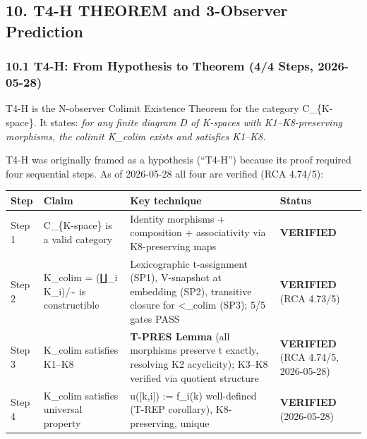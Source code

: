 \documentclass[
  11pt,
]{article}
\newcounter{none} %
\begin{document}
\subsection{10. T4-H THEOREM and 3-Observer
Prediction}\label{t4-h-theorem-and-3-observer-prediction}

\subsubsection{10.1 T4-H: From Hypothesis to Theorem (4/4 Steps,
2026-05-28)}\label{t4-h-from-hypothesis-to-theorem-44-steps-2026-05-28}

T4-H is the N-observer Colimit Existence Theorem for the category
C\_\{K-space\}. It states: \emph{for any finite diagram D of K-spaces
with K1--K8-preserving morphisms, the colimit K\_colim exists and
satisfies K1--K8.}

T4-H was originally framed as a hypothesis (``T4-H'') because its proof
required four sequential steps. As of 2026-05-28 all four are verified
(RCA 4.74/5):

{\def\LTcaptype{none} %
\begin{longtable}[]{@{}
  >{\raggedright\arraybackslash}p{}
  >{\raggedright\arraybackslash}p{}
  >{\raggedright\arraybackslash}p{}
  >{\raggedright\arraybackslash}p{}@{}}
\toprule\noalign{}
\begin{minipage}[b]{\linewidth}\raggedright
Step
\end{minipage} & \begin{minipage}[b]{\linewidth}\raggedright
Claim
\end{minipage} & \begin{minipage}[b]{\linewidth}\raggedright
Key technique
\end{minipage} & \begin{minipage}[b]{\linewidth}\raggedright
Status
\end{minipage} \\
\midrule\noalign{}
\endhead
\bottomrule\noalign{}
\endlastfoot
Step 1 & C\_\{K-space\} is a valid category & Identity morphisms +
composition + associativity via K8-preserving maps &
\textbf{VERIFIED} \\
Step 2 & K\_colim = (∐\_i K\_i)/\textasciitilde{} is constructible &
Lexicographic t-assignment (SP1), V-snapshot at embedding (SP2),
transitive closure for \textless\_colim (SP3); 5/5 gates PASS &
\textbf{VERIFIED} (RCA 4.73/5) \\
Step 3 & K\_colim satisfies K1--K8 & \textbf{T-PRES Lemma} (all
morphisms preserve t exactly, resolving K2 acyclicity); K3--K8 verified
via quotient structure & \textbf{VERIFIED} (RCA 4.74/5, 2026-05-28) \\
Step 4 & K\_colim satisfies universal property & u({[}k,i{]}) := f\_i(k)
well-defined (T-REP corollary), K8-preserving, unique &
\textbf{VERIFIED} (2026-05-28) \\
\end{longtable}
}
\end{document}
